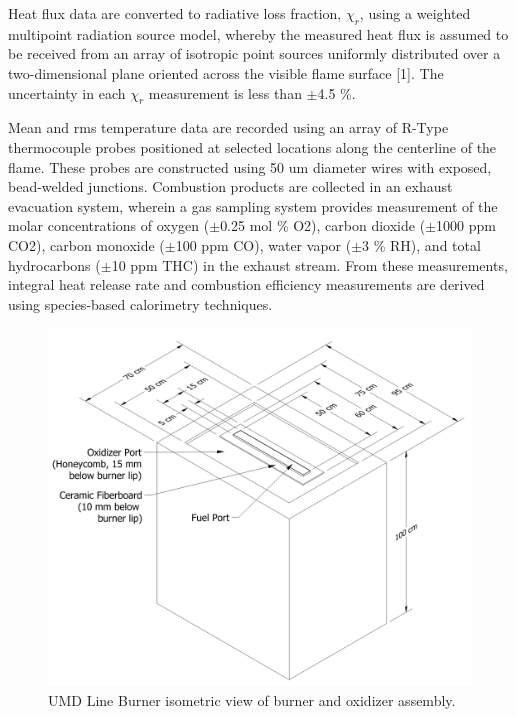 Heat flux data are converted to radiative loss fraction, $\chi_r$, using a weighted multipoint radiation source model, whereby the measured heat flux is assumed to be received from an array of isotropic point sources uniformly distributed over a two-dimensional plane oriented across the visible flame surface [1]. The uncertainty in each $\chi_r$ measurement is less than $\pm$4.5 \%.

Mean and rms temperature data are recorded using an array of R-Type thermocouple probes positioned at selected locations along the centerline of the flame. These probes are constructed using 50 um diameter wires with exposed, bead-welded junctions. Combustion products are collected in an exhaust evacuation system, wherein a gas sampling system provides measurement of the molar concentrations of oxygen ($\pm$0.25 mol \% O2), carbon dioxide ($\pm$1000 ppm CO2), carbon monoxide ($\pm$100 ppm CO), water vapor ($\pm$3 \% RH), and total hydrocarbons ($\pm$10 ppm THC) in the exhaust stream. From these measurements, integral heat release rate and combustion efficiency measurements are derived using species-based calorimetry techniques.

\begin{figure}
\centering
\includegraphics[width=\textwidth]{FIGURES/UMD_Line_Burner/UMD_Line_Burner_isometric}
\caption{UMD Line Burner isometric view of burner and oxidizer assembly.}
\label{fig:umd_line_burner_plan_view}
\end{figure}

